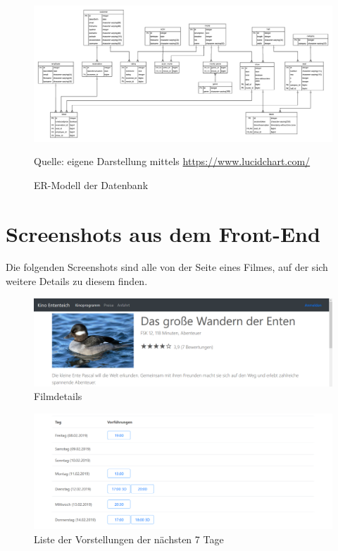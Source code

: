 \begin{figure}
	\centering
	\includegraphics[keepaspectratio, width=\textwidth, height=\textheight]{img/ER-Modell}
	\captionsetup{format=hang}
	\caption{\acs{ER-Modell} der Datenbank}
	\small Quelle: eigene Darstellung mittels \url{https://www.lucidchart.com/}
	\label{fig:Anhang_ER-Modell}
\end{figure}

\chapter{Screenshots aus dem Front-End}
\label{sec:screenshots_frontend}
Die folgenden Screenshots sind alle von der Seite eines Filmes, auf der sich weitere Details zu diesem finden.

\begin{figure}[ht]
	\centering
	\includegraphics[width=\textwidth]{img/screenshots/film02a}
	\captionsetup{format=hang}
	\caption{Filmdetails}
	\label{fig:film02a}
\end{figure}

\begin{figure}[ht]
	\centering
	\includegraphics[width=\textwidth]{img/screenshots/film03}
	\captionsetup{format=hang}
	\caption{Liste der Vorstellungen der nächsten 7 Tage}
	\label{fig:film03}
\end{figure}

